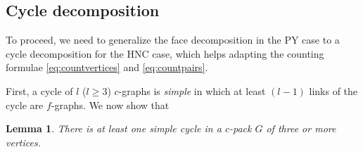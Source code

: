 \documentclass[preprint]{revtex4-1}
\newtheorem{lemm}[thrm]{Lemma}
\begin{document}
\subsection{Cycle decomposition}



To proceed, we need to generalize the face decomposition in the PY case
  to a cycle decomposition for the HNC case,
  which helps adapting the counting formulae
  \eqref{eq:countvertices} and \eqref{eq:countpairs}.


First, a cycle of $l$ ($l \ge 3$) $c$-graphs
  is \emph{simple}
  in which at least $(l-1)$ links of the cycle are $f$-graphs.
%
We now show that
%
%
%
\begin{lemm}
There is at least one simple cycle
  in a $c$-pack $G$ of three or more vertices.
\end{lemm}
%
%
%
\end{document}
